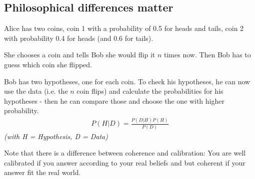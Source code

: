 \subsection*{Philosophical differences matter}
Alice has two coins, coin 1 with a probability of 0.5 for heads and tails, coin 2 with probability 0.4 for heads (and 0.6 for tails). 

She chooses a coin and tells Bob she would flip it $n$ times now. Then Bob has to guess which coin she flipped.

Bob has two hypotheses, one for each coin. To check his hypotheses, he can now use the data (i.e. the $n$ coin flips) and calculate the probabilities for his hypotheses - then he can compare those and choose the one with higher probability.
\begin{align*}
P(H|D) = \frac{P(D|H)P(H)}{P(D)}
\end{align*}
\textit{(with H = Hypothesis, D = Data)}

Note that there is a difference between coherence and calibration:
You are well calibrated if you answer according to your real beliefs and but coherent if your answer fit the real world.

